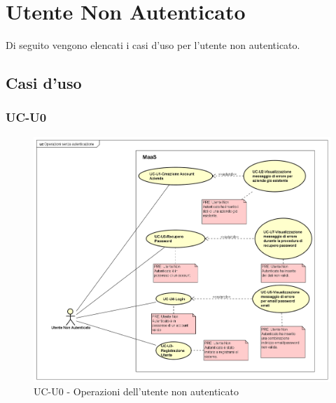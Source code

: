 \section{Utente Non Autenticato}

Di seguito vengono elencati i casi d'uso per l'utente non autenticato.

\subsection{Casi d'uso}

\subsubsection{UC-U0}
  
    \begin{figure}[H]
      \begin{center}
        \includegraphics[width=12cm]{res/img/UCUtenti/UCUtenteNA/UC-U0-OperazioniSenzaAutenticazione_0}
      \caption{UC-U0 - Operazioni dell'utente non autenticato}
      \end{center} 
    \end{figure}    
    
